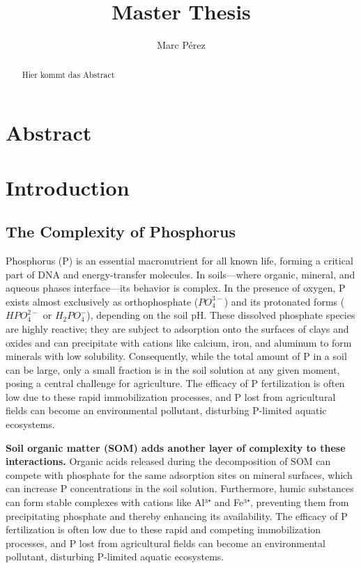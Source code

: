 \documentclass[
  a4paper,
]{article}
\title{Master Thesis}
\author{Marc Pérez}
\date{}
\begin{document}
\maketitle
\begin{abstract}
Hier kommt das Abstract
\end{abstract}

\maketitle
\tableofcontents

\listoffigures
\listoftables

\section{Abstract}\label{abstract}

\section{Introduction}\label{introduction}

\subsection{The Complexity of
Phosphorus}\label{the-complexity-of-phosphorus}

Phosphorus (P) is an essential macronutrient for all known life, forming
a critical part of DNA and energy-transfer molecules. In soils---where
organic, mineral, and aqueous phases interface---its behavior is
complex. In the presence of oxygen, P exists almost exclusively as
orthophosphate (\(PO_4^{3-}\)) and its protonated forms (\(HPO_4^{2-}\)
or \(H_2PO_4^{-}\)), depending on the soil pH. These dissolved phosphate
species are highly reactive; they are subject to adsorption onto the
surfaces of clays and oxides and can precipitate with cations like
calcium, iron, and aluminum to form minerals with low solubility.
Consequently, while the total amount of P in a soil can be large, only a
small fraction is in the soil solution at any given moment, posing a
central challenge for agriculture. The efficacy of P fertilization is
often low due to these rapid immobilization processes, and P lost from
agricultural fields can become an environmental pollutant, disturbing
P-limited aquatic ecosystems.

\textbf{Soil organic matter (SOM) adds another layer of complexity to
these interactions.} Organic acids released during the decomposition of
SOM can compete with phosphate for the same adsorption sites on mineral
surfaces, which can increase P concentrations in the soil solution.
Furthermore, humic substances can form stable complexes with cations
like Al³⁺ and Fe³⁺, preventing them from precipitating phosphate and
thereby enhancing its availability. The efficacy of P fertilization is
often low due to these rapid and competing immobilization processes, and
P lost from agricultural fields can become an environmental pollutant,
disturbing P-limited aquatic ecosystems.
\end{document}
